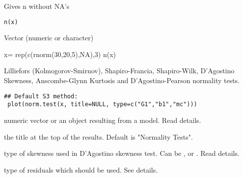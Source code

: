 \documentclass[a4paper]{book}
\begin{document}
\newpage
{}
%
\begin{Description}\relax
Gives n without NA's
\end{Description}
%
\begin{Usage}
\begin{verbatim}
n(x)
\end{verbatim}
\end{Usage}
%
\begin{Arguments}
\begin{ldescription}
\item[\code{x}] 
Vector (numeric or character)

\end{ldescription}
\end{Arguments}
%
\begin{Examples}
\begin{ExampleCode}
x= rep(c(rnorm(30,20,5),NA),3)
n(x)
\end{ExampleCode}
\end{Examples}
\newpage
{}
%
\begin{Description}\relax
Lilliefors (Kolmogorov-Smirnov), Shapiro-Francia, Shapiro-Wilk, 
D'Agostino Skewness, Anscombe-Glynn Kurtosis and D'Agostino-Pearson normality tests.
\end{Description}
%
\begin{Usage}
\begin{verbatim}
## Default S3 method:
 plot(norm.test(x, title=NULL, type=c("G1","b1","mc")))
\end{verbatim}
\end{Usage}
%
\begin{Arguments}
\begin{ldescription}
\item[\code{x }] numeric vector or an object resulting from a model. Read details. 
\item[\code{title }] the title at the top of the results. Default is "Normality Tests".
\item[\code{sk }] type of skewness used in D'Agostino skewness test. Can be , or . Read details.
\item[\code{type }] type of residuals which should be used. See details.
\end{ldescription}
\end{Arguments}
%
\end{document}
